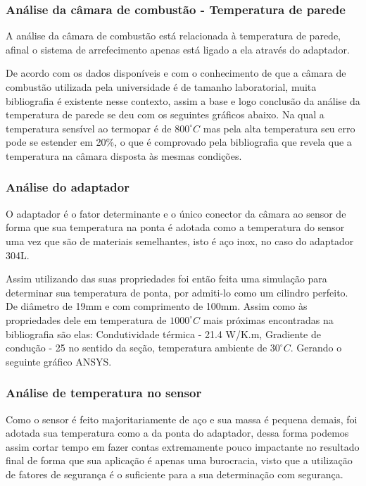 \subsubsection{Análise da câmara de combustão - Temperatura de parede}

A análise da câmara de combustão está relacionada à temperatura de parede, afinal o sistema de arrefecimento apenas está ligado a ela através do adaptador. 

De acordo com os dados disponíveis e com o conhecimento de que a câmara de combustão utilizada pela universidade é de tamanho laboratorial, muita bibliografia é existente nesse contexto, assim a base e logo conclusão da análise da temperatura de parede se deu com os seguintes gráficos abaixo. Na qual a temperatura sensível ao termopar é de $800^{\circ}C$ mas pela alta temperatura seu erro pode se estender em 20\%, o que é comprovado pela bibliografia que revela que a temperatura na câmara disposta às mesmas condições.

\subsubsection{Análise do adaptador}
O adaptador é o fator determinante e o único conector da câmara ao sensor de forma que sua temperatura na ponta é adotada como a temperatura do sensor uma vez que são de materiais semelhantes, isto é aço inox, no caso do adaptador 304L.

Assim utilizando das suas propriedades foi então feita uma simulação para determinar sua temperatura de ponta, por admiti-lo como um cilindro perfeito. De diâmetro de 19mm e com comprimento de 100mm. Assim como às propriedades dele em temperatura de $1000^{\circ}C$ mais próximas encontradas na bibliografia são elas: Condutividade térmica - 21.4 W/K.m, Gradiente de condução - 25 no sentido da seção, temperatura ambiente de $30^{\circ}C$. Gerando o seguinte gráfico ANSYS.

\subsubsection{Análise de temperatura no sensor}
Como o sensor é feito majoritariamente de aço e sua massa é pequena demais, foi adotada sua temperatura como a da ponta do adaptador, dessa forma podemos assim cortar tempo em fazer contas extremamente pouco impactante no resultado final de forma que sua aplicação é apenas uma burocracia, visto que a utilização de fatores de segurança é o suficiente para a sua determinação com segurança.

